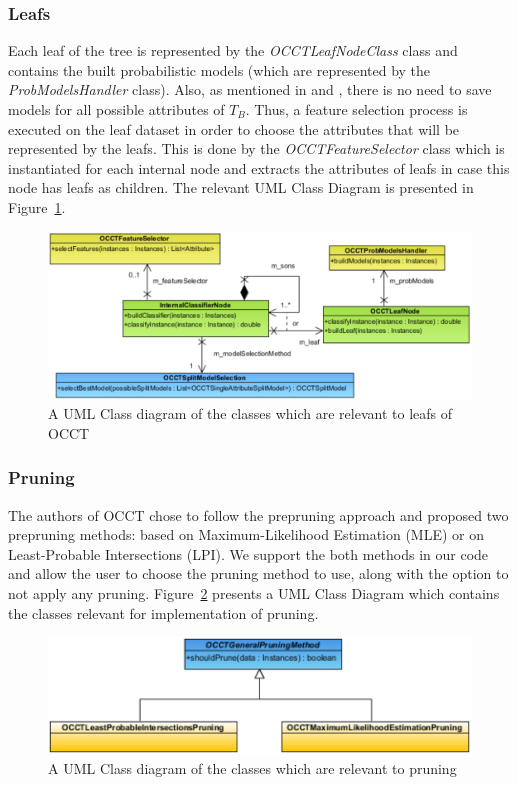 \documentclass[a4paper,12pt]{article}
\begin{document}
\begin{spacing}{1.5}
\subsubsection{Leafs}
Each leaf of the tree is represented by the {\em OCCTLeafNodeClass} class and contains the built probabilistic models (which are represented by the {\em ProbModelsHandler} class). Also, as mentioned in \cite{dror2011thesis} and \cite{dror2014occt}, there is no need to save models for all possible attributes of $T_B$. Thus, a feature selection process is executed on the leaf dataset in order to choose the attributes that will be represented by the leafs. This is done by the {\em OCCTFeatureSelector} class which is instantiated for each internal node and extracts the attributes of leafs in case this node has leafs as children. The relevant UML Class Diagram is presented in Figure~\ref{fig:leafs}.
\vspace{0.5cm}
\begin{figure}[!h]
    \centering
    \includegraphics[width=1\textwidth]{Figures/ClassDiagrams/PDF/Leafs.pdf}
    \caption{A UML Class diagram of the classes which are relevant to leafs of OCCT}
    \label{fig:leafs}
\end{figure}

\subsubsection{Pruning}
The authors of OCCT chose to follow the prepruning approach and proposed two prepruning methods: based on Maximum-Likelihood Estimation (MLE) or on Least-Probable Intersections (LPI). We support the both methods in our code and allow the user to choose the pruning method to use, along with the option to not apply any pruning. Figure~\ref{fig:pruning} presents a UML Class Diagram which contains the classes relevant for implementation of pruning.
\vspace{0.5cm}
\begin{figure}[!h]
    \centering
    \includegraphics[width=1\textwidth]{Figures/ClassDiagrams/PDF/Pruning.pdf}
    \caption{A UML Class diagram of the classes which are relevant to pruning}
    \label{fig:pruning}
\end{figure}


\end{spacing}
\end{document}
